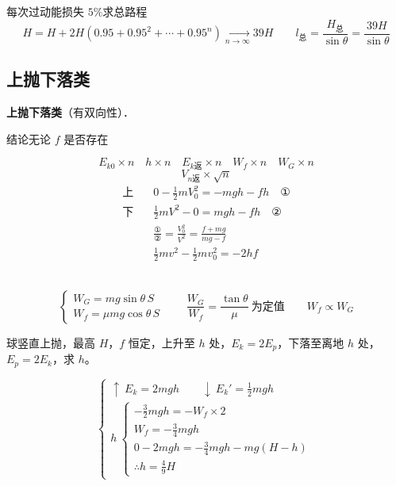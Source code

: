 
每次过动能损失 $5\%$\quad 求总路程
\[
H=H+2H(0.95+0.95^{2}+\cdots+0.95^{n})\xrightarrow[n\to\infty]{}39H
\qquad l_{\text{总}}=\frac{H_{\text{总}}}{\sin\theta}=\frac{39H}{\sin\theta}
\]

\subsection{上抛下落类}
\textbf{上抛下落类}\quad （有双向性）．
\begin{keybox}
结论\quad 无论 $f$ 是否存在
\end{keybox}
\[
E_{k0}\times n\quad h\times n\quad E_{k\text{返}}\times n\quad W_f\times n\quad W_G\times n
\]
\[
V_{n\text{返}}\times\sqrt{n}
\]
\begin{align*}
\text{上}\quad & 0-\tfrac12 mV_0^2=-mgh-fh \quad\text{①}\\
\text{下}\quad & \tfrac12 mV^2-0=mgh-fh \quad\text{②}\\
& \frac{\text{①}}{\text{②}}=\frac{V_0^2}{V^2}=\frac{f+mg}{mg-f}\\
& \tfrac12 mv^2-\tfrac12 mv_0^2=-2hf
\end{align*}

\\
\[
\begin{cases}
W_G = mg\sin\theta\,S\\
W_f = \mu mg\cos\theta\,S
\end{cases}
\qquad
\frac{W_G}{W_f}=\frac{\tan\theta}{\mu}\ \text{为定值}
\qquad
W_f\propto W_G
\]

\begin{problem}
球竖直上抛，最高 $H$，$f$ 恒定，上升至 $h$ 处，$E_k=2E_p$，下落至离地 $h$ 处，$E_p=2E_k$，求 $h$。
\begin{solution}
\[
\left\{
\begin{array}{l}
\uparrow\ E_k=2mgh\qquad \downarrow\ E_k'=\tfrac12 mgh\\[6pt]
h\ \left\{
\begin{array}{l}
-\tfrac32 mgh=-W_f\times 2\\
W_f=-\tfrac34 mgh\\
0-2mgh=-\tfrac34 mgh-mg(H-h)\\
\therefore h=\tfrac49 H
\end{array}
\right.
\end{array}
\right.
\]
\end{solution}
\end{problem}


